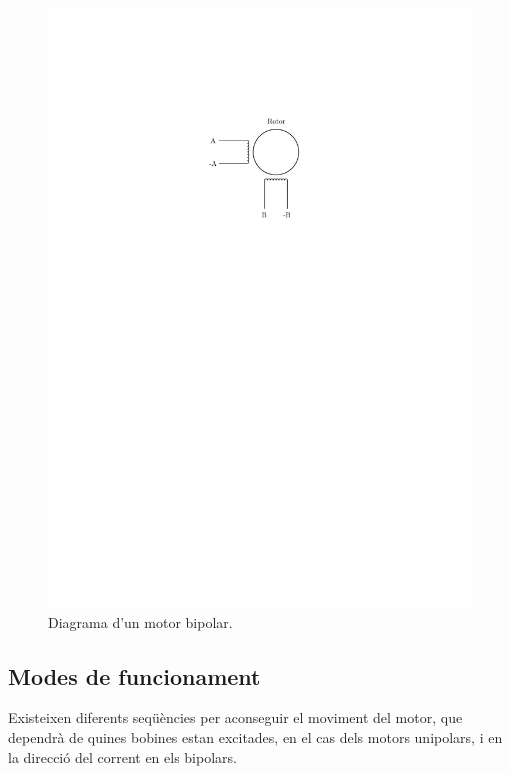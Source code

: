 \begin{itemize}
	\begin{figure}[H]
		\centering
		\includegraphics{Bipolar}
		\caption{Diagrama d'un motor bipolar.}
		\label{fig:biipolar}
	\end{figure}
\end{itemize}

\subsection{Modes de funcionament}
Existeixen diferents seqüències per aconseguir el moviment del motor, que dependrà de quines bobines estan excitades, en el cas dels motors unipolars, i en la direcció del corrent en els bipolars. 

